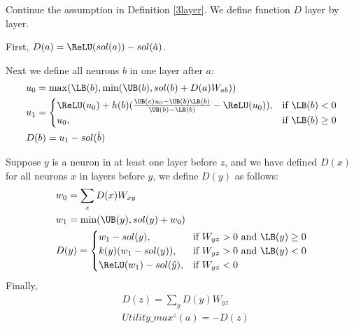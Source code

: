 \begin{definition}
	Continue the assumption in Definition \ref{3layer}. We define function $D$ layer by layer.
	
	First, $D(a) = \ReLU(sol(a))-sol(\hat{a})$.
	
Next we define all neurons $b$ in one layer after $a$: \begin{align}
	&u_0 = \max(\LB(b),\min(\UB(b),  sol(b)+D(a)W_{ab}))\\
	&u_1 = \begin{cases}
		\ReLU(u_0)+h(b)(\frac{\UB(c)u_0-\UB(b)\LB(b)}{\UB(b)-\LB(b)}-\ReLU(u_0)), & \text{if }\LB(b) < 0\\
	u_0, & \text{if }  \LB(b) \geq 0
	\end{cases}\\
	&D(b) = u_1-sol(\hat{b})
\end{align}
	
	Suppose $y$ is a neuron in at least one layer before $z$, and we have defined $D(x)$ for all neurons $x$ in layers before $y$, we define $D(y)$ as follows:
	\begin{align}
		&w_0 = \sum_x D(x)W_{xy}\\
		&w_1 = \min(\UB(y),sol(y)+w_0)\\		
		&D(y) =
		\begin{cases}
			w_1-sol({y}), & \text{if }W_{yz} > 0 \text{ and } \LB(y)\geq 0\\
		k(y)(w_1-sol({y})), & \text{if }W_{yz} > 0 \text{ and } \LB(y)< 0\\
		\ReLU(w_1)-sol(\hat{y})	, & \text{if }  W_{yz} < 0
		\end{cases}\\
	\end{align}	Finally, 	\begin{align*}
	&D(z) = \sum_y D(y)W_{yz}\\
	&Utility\_max^z(a) = -D(z)
	\end{align*}
	
\end{definition}
		
